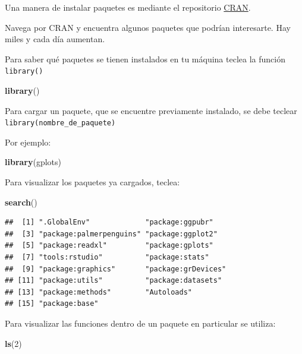 \documentclass[
]{book}
\newenvironment{Shaded}{\begin{snugshade}}{\end{snugshade}}
\newcommand{\DecValTok}[1]{\textcolor[rgb]{0.00,0.00,0.81}{#1}}
\newcommand{\FunctionTok}[1]{\textcolor[rgb]{0.13,0.29,0.53}{\textbf{#1}}}
\newcommand{\NormalTok}[1]{#1}
\begin{document}
Una manera de instalar paquetes es mediante el repositorio \href{https://cran.r-project.org/}{CRAN}.

Navega por CRAN y encuentra algunos paquetes que podrían interesarte. Hay miles y cada día aumentan.

Para saber qué paquetes se tienen instalados en
tu máquina teclea la función \texttt{library()}

\begin{Shaded}
\begin{Highlighting}[]
\FunctionTok{library}\NormalTok{()}
\end{Highlighting}
\end{Shaded}

Para cargar un paquete, que se encuentre previamente instalado, se debe teclear
\texttt{library(nombre\_de\_paquete)}

Por ejemplo:

\begin{Shaded}
\begin{Highlighting}[]
\FunctionTok{library}\NormalTok{(gplots)  }
\end{Highlighting}
\end{Shaded}

Para visualizar los paquetes ya cargados, teclea:

\begin{Shaded}
\begin{Highlighting}[]
\FunctionTok{search}\NormalTok{()}
\end{Highlighting}
\end{Shaded}

\begin{verbatim}
##  [1] ".GlobalEnv"             "package:ggpubr"        
##  [3] "package:palmerpenguins" "package:ggplot2"       
##  [5] "package:readxl"         "package:gplots"        
##  [7] "tools:rstudio"          "package:stats"         
##  [9] "package:graphics"       "package:grDevices"     
## [11] "package:utils"          "package:datasets"      
## [13] "package:methods"        "Autoloads"             
## [15] "package:base"
\end{verbatim}

Para visualizar las funciones dentro de un paquete en particular se utiliza:

\begin{Shaded}
\begin{Highlighting}[]
\FunctionTok{ls}\NormalTok{(}\DecValTok{2}\NormalTok{)}
\end{Highlighting}
\end{Shaded}
\end{document}
